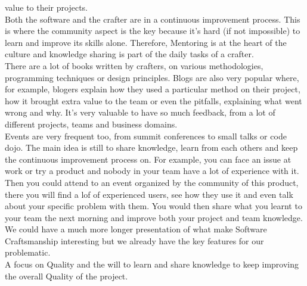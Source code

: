 value to their projects.\\
\newline
Both the software and the crafter are in a continuous improvement process.
This is where the community aspect is the key because it's hard (if not
impossible) to learn and improve its skills alone.
Therefore, Mentoring is at the heart of the culture and knowledge
sharing is part of the daily tasks of a crafter. \\
\newline
There are a lot of books written by crafters, on various methodologies,
programming techniques or design principles.
Blogs are also very popular where, for example, blogers explain how they
used a particular method on their project, how it brought extra value to
the team or even the pitfalls, explaining what went wrong and why.
It's very valuable to have so much feedback, from a lot of different
projects, teams and business domains. \\
\newline
Events are very frequent too, from summit conferences to small talks or
code dojo.
The main idea is still to share knowledge, learn from each others and keep
the continuous improvement process on.
For example, you can face an issue at work or try a product and nobody
in your team have a lot of experience with it.
Then you could attend to an event organized by the community of this
product, there you will find a lof of experienced users, see how they
use it and even talk about your specific problem with them.
You would then share what you learnt to your team the next morning and
improve both your project and team knowledge. \\
\newline
We could have a much more longer presentation of what make Software
Craftsmanship interesting but we already have the key features for
our problematic. \\
A focus on Quality and the will to learn and share knowledge to keep
improving the overall Quality of the project.
